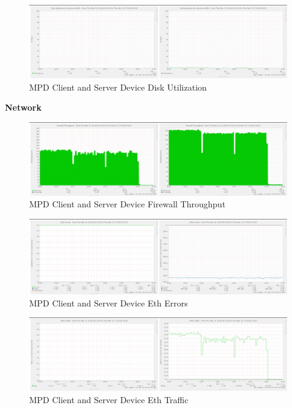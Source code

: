 \documentclass[11pt,a4paper,headinclude=false,footinclude=false]{scrreprt}
\begin{document}
\begin{figure}[H]
\includegraphics{ResultsAndAnalysis/MPDServerTestImages/008MPDDiskUtilization.png}
\centering
\caption{MPD Client and Server Device Disk Utilization}
\label{MPDDiskUtil}
\end{figure}

\textbf{Network}

\begin{figure}[H]
\includegraphics{ResultsAndAnalysis/MPDServerTestImages/011MPDFirewallThroughput.png}
\centering
\caption{MPD Client and Server Device Firewall Throughput}
\label{MPDFirewallThroughput}
\end{figure}

\begin{figure}[H]
\includegraphics{ResultsAndAnalysis/MPDServerTestImages/009MPDEth0Errors.png}
\centering
\caption{MPD Client and Server Device Eth Errors}
\label{MPDEthError}
\end{figure}

\begin{figure}[H]
\includegraphics{ResultsAndAnalysis/MPDServerTestImages/010MPDEth0Traffic.png}
\centering
\caption{MPD Client and Server Device Eth Traffic}
\label{MPDEthTraffic}
\end{figure}
\end{document}
